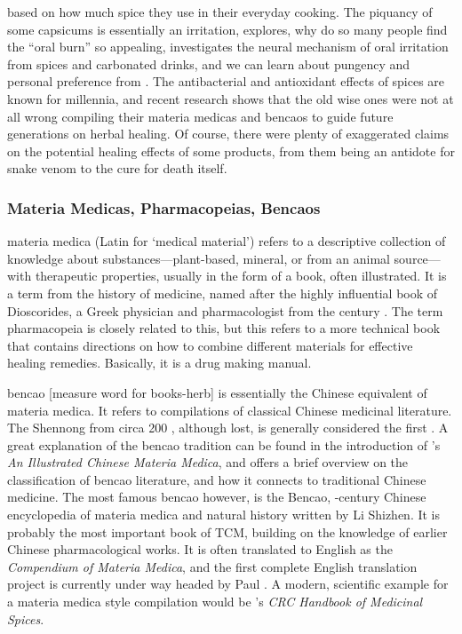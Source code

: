 based on how much spice they use in their everyday cooking. The piquancy of some capsicums is essentially an irritation, \textcite{spence_why_2018} explores, why do so many people find the ``oral burn'' so appealing, \textcite{carstens_it_2002} investigates the neural mechanism of oral irritation from spices and carbonated drinks, and we can learn about pungency and personal preference from \textcite{prescott_pungency_1995}. The antibacterial and antioxidant effects of spices are known for millennia, and recent research \autocite{billing_antimicrobial_1998,nilius_spices_2013,yashin_antioxidant_2017} shows that the old wise ones were not at all wrong compiling their \glspl{materia medica} and \glspl{bencao} to guide future generations on herbal healing. Of course, there were plenty of exaggerated claims on the potential healing effects of some products, from them being an antidote for snake venom to the cure for death itself.

\subsubsection{Materia Medicas, Pharmacopeias, Bencaos}

\Gls{materia medica} (Latin for `medical material') refers to a descriptive collection of knowledge about substances---plant-based, mineral, or from an animal source---with therapeutic properties, usually in the form of a book, often illustrated. It is a term from the history of medicine, named after the highly influential book of Dioscorides, a Greek physician and pharmacologist from the  century \AD{}. The term \gls{pharmacopeia} is closely related to this, but this refers to a more technical book that contains directions on how to combine different materials for effective healing remedies. Basically, it is a drug making manual.

\Gls{bencao}  [measure word for books-herb] is essentially the Chinese equivalent of materia medica. It refers to compilations of classical Chinese medicinal literature. The \gls{Shennong} from circa 200 \AD, although lost, is generally considered the first \autocites[see][]{nugent-head_first_2014}{yang_divine_1998}. A great explanation of the \gls{bencao} tradition can be found in the introduction of \textcite{wu_illustrated_2005}'s \textit{An Illustrated Chinese Materia Medica}, and \textcite{zhao_concise_2018} offers a brief overview on the classification of \gls{bencao} literature, and how it connects to traditional Chinese medicine. The most famous \gls{bencao} however, is the \gls{Bencao}, -century Chinese encyclopedia of materia medica and natural history written by Li Shizhen. It is probably the most important book of \gls{TCM}, building on the knowledge of earlier Chinese pharmacological works. It is often translated to English as the \textit{Compendium of Materia Medica}, and the first complete English translation project is currently under way headed by Paul \textcite{unschuld_first_2022}. 
A modern, scientific example for a materia medica style compilation would be \textcite{duke_crc_2002}'s \textit{CRC Handbook of Medicinal Spices}.

